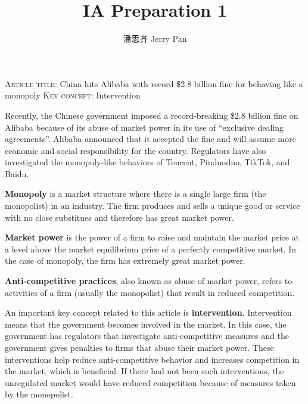 \documentclass{article}
\begin{document}
\title{\vspace{-2.75cm} IA Preparation 1}
\author{潘思齐 Jerry Pan}
\date{}
\maketitle

\noindent \textsc{Article title}: China hits Alibaba with record \$2.8 billion fine for behaving like a monopoly \newline
\textsc{Key concept}: Intervention

\noindent \hrulefill

\vspace{0.5cm}

Recently, the Chinese government imposed a record-breaking \$2.8 billion fine on Alibaba because of its abuse of market power in its use of ``exclusive dealing agreements''. Alibaba announced that it accepted the fine and will assume more economic and social responsibility for the country. Regulators have also investigated the monopoly-like behaviors of Tencent, Pinduoduo, TikTok, and Baidu.

\vspace{0.5cm}

\textbf{Monopoly} is a market structure where there is a single large firm (the monopolist) in an industry. The firm produces and sells a unique good or service with no close substitues and therefore has great market power. 

\textbf{Market power} is the power of a firm to raise and maintain the market price at a level above the market equilibrium price of a perfectly competitive market. In the case of monopoly, the firm has extremely great market power. 

\textbf{Anti-competitive practices}, also known as abuse of market power, refers to activities of a firm (usually the monopolist) that result in reduced competition.

\vspace{0.5cm}

An important key concept related to this article is \textbf{intervention}. Intervention means that the government becomes involved in the market. In this case, the government has regulators that investigate anti-competitive measures and the government gives penalties to firms that abuse their market power. These interventions help reduce anti-competitive behavior and increases competition in the market, which is beneficial. If there had not been such interventions, the unregulated market would have reduced competition because of measures taken by the monopolist.
\end{document}
